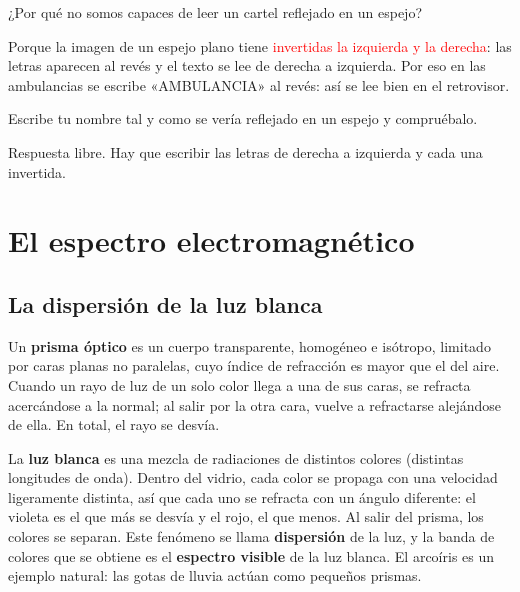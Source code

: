 \begin{exercise}
    ¿Por qué no somos capaces de leer un cartel reflejado en un espejo?
    \begin{solu}
        Porque la imagen de un espejo plano tiene \textcolor{red}{invertidas la izquierda y la derecha}: las letras aparecen al revés y el texto se lee de derecha a izquierda. Por eso en las ambulancias se escribe «AMBULANCIA» al revés: así se lee bien en el retrovisor.
    \end{solu}
\end{exercise}

\begin{exercise}
    Escribe tu nombre tal y como se vería reflejado en un espejo y compruébalo.
    \begin{solu}
        Respuesta libre. Hay que escribir las letras de derecha a izquierda y cada una invertida.
    \end{solu}
\end{exercise}

\section{El espectro electromagnético}

\subsection{La dispersión de la luz blanca}

Un \textbf{prisma óptico} es un cuerpo transparente, homogéneo e isótropo, limitado por caras planas no paralelas, cuyo índice de refracción es mayor que el del aire. Cuando un rayo de luz de un solo color llega a una de sus caras, se refracta acercándose a la normal; al salir por la otra cara, vuelve a refractarse alejándose de ella. En total, el rayo se desvía.

La \textbf{luz blanca} es una mezcla de radiaciones de distintos colores (distintas longitudes de onda). Dentro del vidrio, cada color se propaga con una velocidad ligeramente distinta, así que cada uno se refracta con un ángulo diferente: el violeta es el que más se desvía y el rojo, el que menos. Al salir del prisma, los colores se separan. Este fenómeno se llama \textbf{dispersión} de la luz, y la banda de colores que se obtiene es el \textbf{espectro visible} de la luz blanca. El arcoíris es un ejemplo natural: las gotas de lluvia actúan como pequeños prismas.

